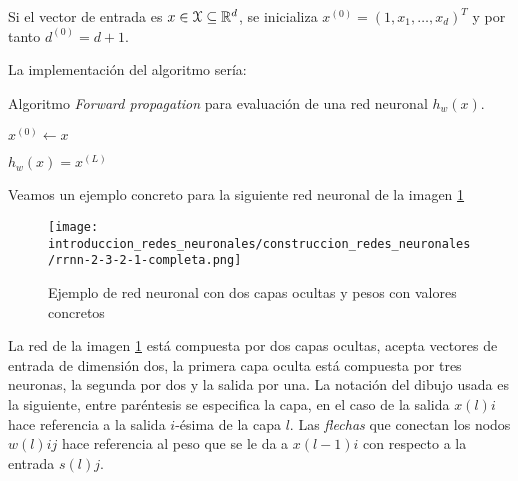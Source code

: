 Si el vector de entrada es $x \in \mathcal{X} \subseteq \mathbb{R}^d$, 
se inicializa  $x^{(0)} = (1,x_1, \ldots, x_d)^T$ y por tanto $d^{(0)} = d+1.$


La implementación del algoritmo sería:

\begin{algorithm}[H]
    \caption{Algoritmo \textit{Forward propagation} para evaluación de una red neuronal $h_w(x)$.}
    \begin{algorithmic}[1]
        \STATE $x^{(0)} \leftarrow x$ 

        \STATE {}
        \STATE $h_w(x) = x^{(L)}$ 
\end{algorithmic}
\end{algorithm}

Veamos un ejemplo concreto para la siguiente red neuronal de la imagen \ref{img:construccion_rrnn:rrnn-2-3-2-1}
\begin{figure}[h!]
    \texttt{[image: introduccion\_redes\_neuronales/construccion\_redes\_neuronales/rrnn-2-3-2-1-completa.png]}
    \caption{Ejemplo de red neuronal con dos capas ocultas y pesos con valores concretos}
    \label{img:construccion_rrnn:rrnn-2-3-2-1}
\end{figure} 

La red de la imagen \ref{img:construccion_rrnn:rrnn-2-3-2-1} está 
compuesta por dos capas ocultas, acepta vectores de entrada de dimensión dos, 
la primera capa oculta está compuesta por tres neuronas, 
la segunda por dos y la salida por una. 
La notación del dibujo usada es la siguiente, entre paréntesis se 
especifica la capa, en el caso de la salida $x(l)i$ hace referencia a la salida $i$-ésima de la capa $l$. Las \textit{flechas} que conectan los nodos $w(l)ij$ hace referencia al peso que se le da a $x(l-1)i$ con respecto a la entrada $s(l)j$.

